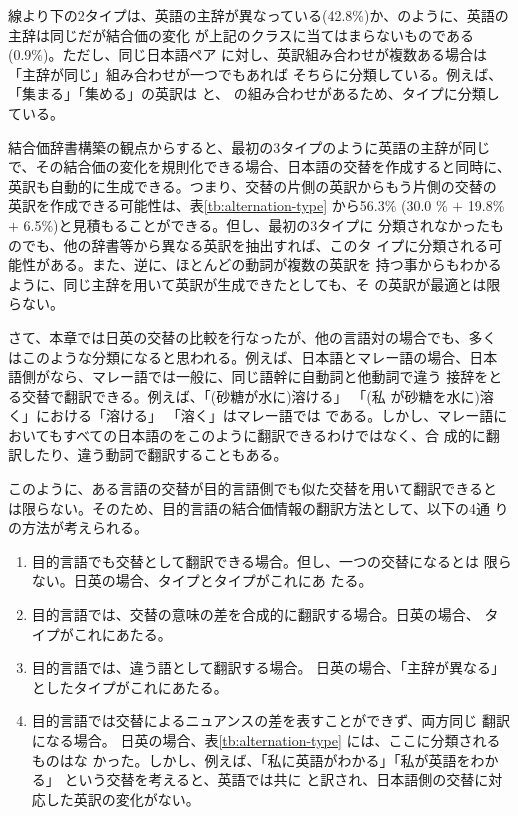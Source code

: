 \documentclass[japanese]{jnlp}
\newcommand{\eng}[1]{}
\newcommand{\iz}[1]{}
\newcommand{\abs}{}
\newcommand{\sbj}{}
\newcommand{\obj}{}
\newcommand{\typeSO}{}
\newcommand{\ul}[1]{}
\newcommand{\soalt}{}
\def\smpt#1{}
\renewcommand{\smpt}[1]{}
\newcommand{\tot}{}
\begin{document}
線より下の2タイプは、英語の主辞が異なっている(42.8\%)か、\eng{\sbj play
  \tot \abs play with \obj }のように、英語の主辞は同じだが結合価の変化
が上記のクラスに当てはまらないものである(0.9\%)。ただし、同じ日本語ペア
に対し、英訳組み合わせが複数ある場合は「主辞が同じ」組み合わせが一つでもあれば
そちらに分類している。例えば、「集まる」\tot 「集める」の英訳は
\eng{gather \tot collect} と、\eng{be gathered \tot
gather} の組み合わせがあるため、\iz{passive}タイプに分類している。


結合価辞書構築の観点からすると、最初の3タイプのように英語の主辞が同じ
で、その結合価の変化を規則化できる場合、日本語の交替を作成すると同時に、
英訳も自動的に生成できる。つまり、交替の片側の英訳からもう片側の交替の
英訳を作成できる可能性は、表\ref{tb:alternation-type} から56.3\% (30.0
\% $+$ 19.8\% $+$ 6.5\%)と見積もることができる。但し、最初の3タイプに
分類されなかったものでも、他の辞書等から異なる英訳を抽出すれば、このタ
イプに分類される可能性がある。また、逆に、ほとんどの動詞が複数の英訳を
持つ事からもわかるように、同じ主辞を用いて英訳が生成できたとしても、そ
の英訳が最適とは限らない。


\smpt{日マ}

さて、本章では日英の交替の比較を行なったが、他の言語対の場合でも、多く
はこのような分類になると思われる。例えば、日本語とマレー語の場合、日本
語側が\soalt なら、マレー語では一般に、同じ語幹に自動詞と他動詞で違う
接辞をとる交替で翻訳できる。例えば、「(砂糖が水に)溶ける」 \tot 「(私
が砂糖を水に)溶く」における「溶ける」 \tot{} 「溶く」はマレー語では
\eng{larut} \tot \eng{\ul{me}larut\ul{kan}}である。しかし、マレー語に
おいてもすべての日本語の\soalt をこのように翻訳できるわけではなく、合
成的に翻訳したり、違う動詞で翻訳することもある。

このように、ある言語の交替が目的言語側でも似た交替を用いて翻訳できると
は限らない。そのため、目的言語の結合価情報の翻訳方法として、以下の4通
りの方法が考えられる。

\begin{enumerate}
\item 目的言語でも交替として翻訳できる場合。但し、一つの交替になるとは
  限らない。日英の場合、\typeSO{}タイプと\iz{passive}タイプがこれにあ
  たる。
  
\item 目的言語では、交替の意味の差を合成的に翻訳する場合。日英の場合、
  \iz{synthetic}タイプがこれにあたる。

\item 目的言語では、違う語として翻訳する場合。
  日英の場合、「主辞が異なる」としたタイプがこれにあたる。

\item 目的言語では交替によるニュアンスの差を表すことができず、両方同じ
  翻訳になる場合。
  日英の場合、表\ref{tb:alternation-type} には、ここに分類されるものはな
  かった。しかし、例えば、「私に英語がわかる」「私が英語をわかる」
  という交替を考えると、英語では共に\eng{I can understand English}
  と訳され、日本語側の交替に対応した英訳の変化がない。
\end{enumerate}
\end{document}
